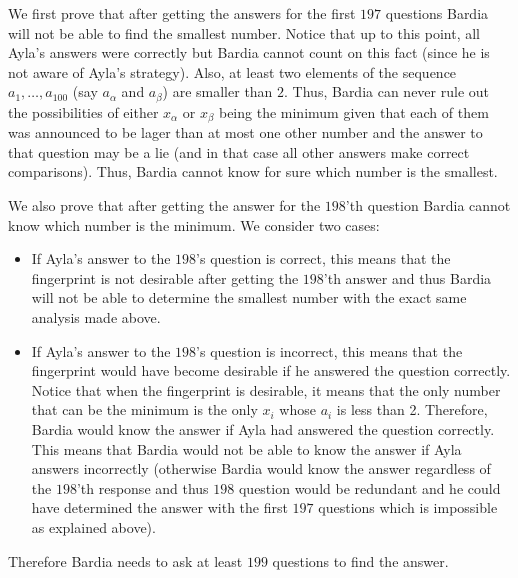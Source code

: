 \begin{solution}
We first prove that after getting the answers for the first $197$ questions Bardia will not be able to find the smallest number. Notice that up to this point, all Ayla's answers were correctly but Bardia cannot count on this fact (since he is not aware of Ayla's strategy). Also, at least two elements of the sequence $a_1, \ldots, a_{100}$ (say $a_{\alpha}$ and $a_{\beta}$) are smaller than $2$. Thus, Bardia can never rule out the possibilities of either $x_{\alpha}$ or $x_{\beta}$ being the minimum given that each of them was announced to be lager than at most one other number and the answer to that question may be a lie (and in that case all other answers make correct comparisons). Thus, Bardia cannot know for sure which number is the smallest.

We also prove that after getting the answer for the $198$'th question Bardia cannot know which number is the minimum. We consider two cases: 
\begin{itemize}
	\item If Ayla's answer to the $198$'s question is correct, this means that the fingerprint is not desirable after getting the $198$'th answer and thus Bardia will not be able to determine the smallest number with the exact same analysis made above.
	\item If Ayla's answer to the $198$'s question is incorrect, this means that the fingerprint would have become desirable if he answered the question correctly. Notice that when the fingerprint is desirable, it means that the only number that can be the minimum is the only $x_i$ whose $a_i$ is less than 2. Therefore, Bardia would know the answer if Ayla had answered the question correctly. This means that Bardia would not be able to know the answer if Ayla answers incorrectly (otherwise Bardia would know the answer regardless of the $198$'th response and thus $198$ question would be redundant and he could have determined the answer with the first $197$ questions which is impossible as explained above).
\end{itemize}

Therefore Bardia needs to ask at least $199$ questions to find the answer.
\end{solution}

